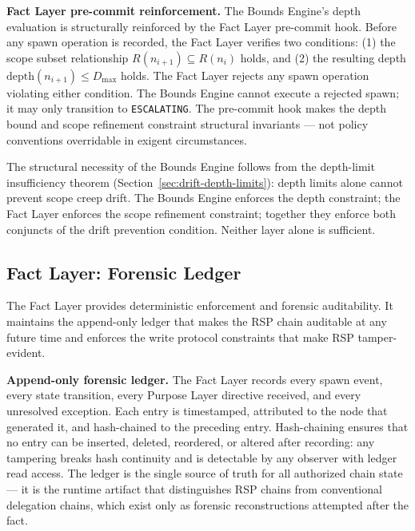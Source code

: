 \medskip
\noindent\textbf{Fact Layer pre-commit reinforcement.} The Bounds Engine's depth evaluation is structurally reinforced by the Fact Layer pre-commit hook. Before any spawn operation is recorded, the Fact Layer verifies two conditions: (1) the scope subset relationship $R(n_{i+1}) \subseteq R(n_i)$ holds, and (2) the resulting depth $\mathrm{depth}(n_{i+1}) \leq D_{\mathrm{max}}$ holds. The Fact Layer rejects any spawn operation violating either condition. The Bounds Engine cannot execute a rejected spawn; it may only transition to \texttt{ESCALATING}. The pre-commit hook makes the depth bound and scope refinement constraint structural invariants — not policy conventions overridable in exigent circumstances.

The structural necessity of the Bounds Engine follows from the depth-limit insufficiency theorem (Section~\ref{sec:drift-depth-limits}): depth limits alone cannot prevent scope creep drift. The Bounds Engine enforces the depth constraint; the Fact Layer enforces the scope refinement constraint; together they enforce both conjuncts of the drift prevention condition. Neither layer alone is sufficient.

\subsection{Fact Layer: Forensic Ledger}
\label{sec:rs-fact-ledger}

The Fact Layer provides deterministic enforcement and forensic auditability. It maintains the append-only ledger that makes the RSP chain auditable at any future time and enforces the write protocol constraints that make RSP tamper-evident.

\medskip
\noindent\textbf{Append-only forensic ledger.} The Fact Layer records every spawn event, every state transition, every Purpose Layer directive received, and every unresolved exception. Each entry is timestamped, attributed to the node that generated it, and hash-chained to the preceding entry. Hash-chaining ensures that no entry can be inserted, deleted, reordered, or altered after recording: any tampering breaks hash continuity and is detectable by any observer with ledger read access. The ledger is the single source of truth for all authorized chain state — it is the runtime artifact that distinguishes RSP chains from conventional delegation chains, which exist only as forensic reconstructions attempted after the fact.

